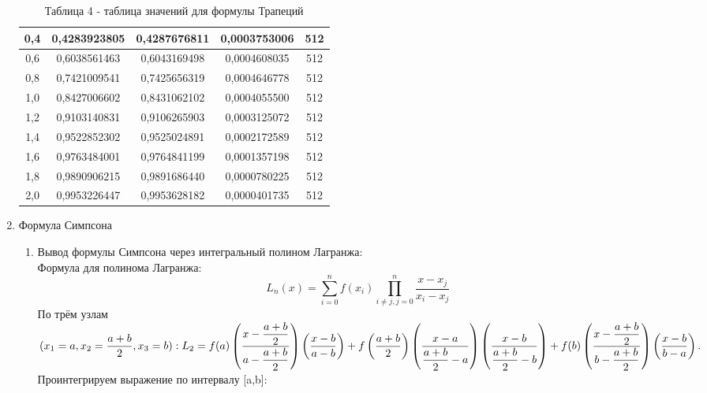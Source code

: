 \documentclass[14pt]{article}
\begin{document}
\begin{enumerate}[label = \arabic*.]
{\begin{table}[h]
\begin{tabular}{|c|c|c|c|c|}
            \hline
            0,4 & 0,4283923805 & 0,4287676811 & 0,0003753006 & 512\\
            \hline
            0,6 & 0,6038561463 & 0,6043169498 & 0,0004608035 & 512\\
            \hline
            0,8 & 0,7421009541 & 0,7425656319 & 0,0004646778 & 512\\
            \hline
            1,0 & 0,8427006602 & 0,8431062102 & 0,0004055500 & 512\\
            \hline
            1,2 & 0,9103140831 & 0,9106265903 & 0,0003125072 & 512\\
            \hline
            1,4 & 0,9522852302 & 0,9525024891 & 0,0002172589 & 512\\
            \hline
            1,6 & 0,9763484001 & 0,9764841199 & 0,0001357198 & 512\\
            \hline
            1,8 & 0,9890906215 & 0,9891686440 & 0,0000780225 & 512\\
            \hline
            2,0 & 0,9953226447 & 0,9953628182 & 0,0000401735 & 512\\
            \hline
          \end{tabular}
          \caption*{\small{Таблица 4 - таблица значений для формулы Трапеций}}
        \end{table}
    }
    \item Формула Симпсона
        \begin{enumerate}
            \item {Вывод формулы Симпсона через интегральный полином Лагранжа:\\
            Формула для полинома Лагранжа:
            \begin{equation}
                L_n(x) = \sum_{i=0}^{n}f(x_i)\prod_{i \ne j, j = 0}^{n}\frac{x - x_j}{x_i - x_j}
            \end{equation}
            По трём узлам $(x_1 = a, x_2 = \dfrac{a+b}{2}, x_3 = b):
            L_2 = f(a)\left(\dfrac{x - \dfrac{a+b}{2}}{a - \dfrac{a+b}{2}}\right)\left(\dfrac{x - b}{a - b}\right)+\\
            f\left(\dfrac{a +b}{2}\right)\left(\dfrac{x-a}{\dfrac{a+b}{2} - a}\right)\left(\dfrac{x-b}{\dfrac{a+b}{2} - b}\right)+ f(b)\left(\dfrac{x - \dfrac{a+b}{2}}{b - \dfrac{a+b}{2}}\right)\left(\dfrac{x - b}{b - a}\right).$\\
            \hfill\break
            Проинтегрируем выражение по интервалу [a,b]:
            \begin{equation}

\end{equation}}
\end{enumerate}
\end{enumerate}
\end{document}
